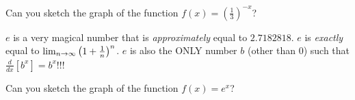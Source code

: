 \documentclass[12pt, a4paper]{article}
\begin{document}
\vspace{-1.00in}
\begin{ex}
  Can you sketch the graph of the function $f(x) = \left(\frac{1}{3}\right)^{-x}$?
\end{ex}
\vspace{-0.90in}
\begin{defi}
  $e$ is a very magical number that is \emph{approximately} equal to $2.7182818$.  $e$ is \emph{exactly} equal to $\lim_{n \to \infty} \left( 1 + \frac{1}{n} \right)^n$.  $e$ is also the ONLY number $b$ (other than 0) such that $\frac{d}{dx}[b^x] = b^x$!!!
\end{defi}
\vspace{-0.90in}
\begin{ex}
  Can you sketch the graph of the function $f(x) = e^{x}$?
\end{ex}
\end{document}
